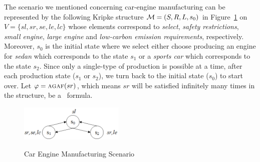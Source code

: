 \documentclass{article}
\begin{document}


\begin{example}\label{exmp:1}
The scenario we mentioned concerning car-engine manufacturing can be represented by the following Kripke structure ${\cal M}=(S, R, L, s_0)$ in Figure~\ref{BVM} on $V=\{ sl, sr, se, le, lc\}$ whose elements correspond to  \emph{select},  \emph{safety restrictions}, \emph{small engine},  \emph{large engine} and \emph{low-carbon emission requirements}, respectively. Moreover, $s_0$ is the initial state where we select either choose producing an engine for \emph{sedan} which corresponds to the state $s_1$ or a \emph{sports car} which corresponds to the state $s_2$.
Since only a single-type of production is possible at a time, after each production state ($s_1$ or $s_2$), we turn back to the initial state ($s_0$) to start over.
Let $\varphi=\textsc{a}\textsc{g} \textsc{a} \textsc{f}(sr)$, which means $sr$ will be satisfied infinitely many times in the structure, be a \CTL\ formula.
\begin{figure}
  \centering
  \includegraphics[width=5cm]{BVM.png}\\
  \caption{Car Engine Manufacturing Scenario }\label{BVM}
\end{figure}
\end{example}
\end{document}
